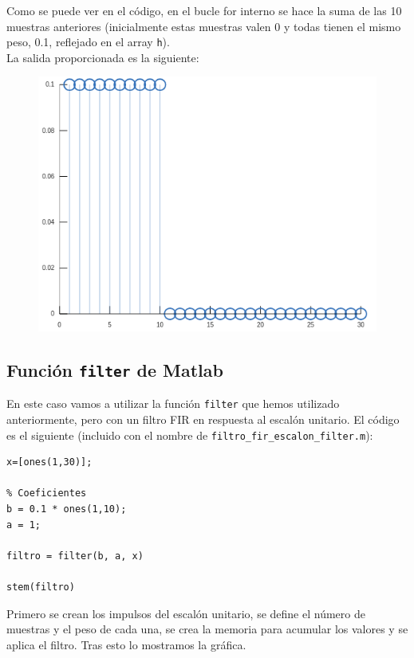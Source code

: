\documentclass[11pt,a4paper]{article}
\begin{document}
Como se puede ver en el código, en el bucle for interno se hace la suma de las 10 muestras anteriores (inicialmente estas muestras valen 0 y todas tienen el mismo peso, 0.1, reflejado en el array \texttt{h}).\\

La salida proporcionada es la siguiente:

\begin{figure}[H]
	\centering
	\includegraphics[scale=0.5]{img/fir-grafica.png}
\end{figure}

\subsection{Función \texttt{filter} de Matlab}

En este caso vamos a utilizar la función \texttt{filter} que hemos utilizado anteriormente, pero con un filtro FIR en respuesta al escalón unitario. El código es el siguiente (incluido con el nombre de \texttt{filtro\_fir\_escalon\_filter.m}):

\begin{lstlisting}[frame=single]
% Se define el array con los pulsos
x=[ones(1,30)];

% Coeficientes
b = 0.1 * ones(1,10);
a = 1;

filtro = filter(b, a, x)

stem(filtro)
\end{lstlisting}

Primero se crean los impulsos del escalón unitario, se define el número de muestras y el peso de cada una, se crea la memoria para acumular los valores y se aplica el filtro. Tras esto lo mostramos la gráfica.\\
\end{document}
